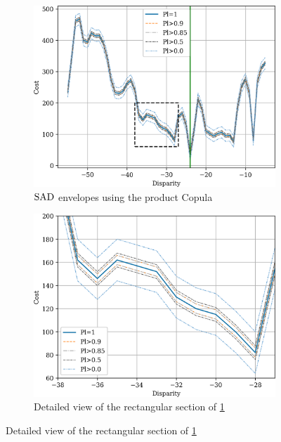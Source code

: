 \begin{figure}
    \centering
    \begin{subfigure}[t]{0.48\linewidth}
        \centering
        \includegraphics[width=\linewidth]{Images/Chap_4/bel_independence_100_120.png}
        \caption{${\mathrm{SAD}}$ envelopes using the product Copula}
        \label{fig:belief_independence}
    \end{subfigure}\hfill
    \begin{subfigure}[t]{0.48\linewidth}
        \centering
        \includegraphics[width=\linewidth]{Images/Chap_4/bel_independence_100_120_zoom.png}
        \caption{Detailed view of the rectangular section of \ref{fig:belief_independence}}
        \label{fig:belief_independence_zoom}

\end{subfigure}
\end{figure}
